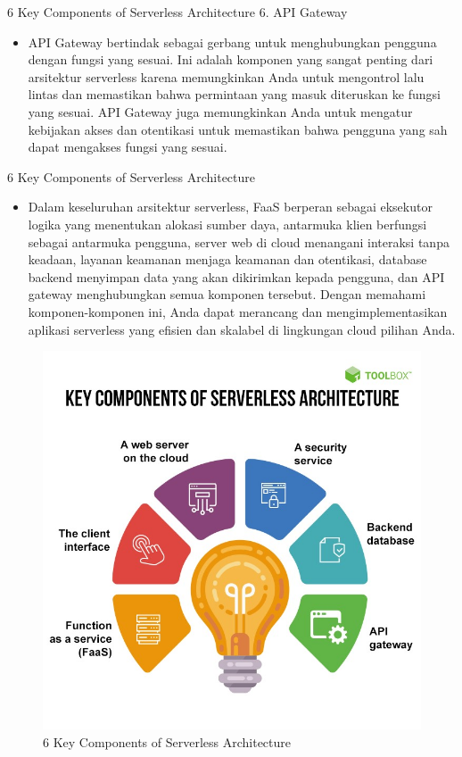 \documentclass{beamer}
\begin{document}
    \begin{frame}{6 Key Components of Serverless Architecture}
    	6. API Gateway
        \begin{itemize}
            \item API Gateway bertindak sebagai gerbang untuk menghubungkan pengguna dengan fungsi yang sesuai. 
            Ini adalah komponen yang sangat penting dari arsitektur serverless karena memungkinkan Anda untuk mengontrol lalu lintas dan memastikan bahwa permintaan yang masuk diteruskan ke fungsi yang sesuai. 
            API Gateway juga memungkinkan Anda untuk mengatur kebijakan akses dan otentikasi untuk memastikan bahwa pengguna yang sah dapat mengakses fungsi yang sesuai.
        \end{itemize}
    \end{frame}

    \begin{frame}{6 Key Components of Serverless Architecture}
        \begin{itemize}
            \item Dalam keseluruhan arsitektur serverless, FaaS berperan sebagai eksekutor logika yang menentukan alokasi sumber daya, antarmuka klien berfungsi sebagai antarmuka pengguna, server web di cloud menangani interaksi tanpa keadaan, layanan keamanan menjaga keamanan dan otentikasi, database backend menyimpan data yang akan dikirimkan kepada pengguna, dan API gateway menghubungkan semua komponen tersebut. 
            Dengan memahami komponen-komponen ini, Anda dapat merancang dan mengimplementasikan aplikasi serverless yang efisien dan skalabel di lingkungan cloud pilihan Anda.
        \end{itemize}
    \end{frame}
    \begin{frame}
    	\begin{figure}
    		\includegraphics[width=0.8\linewidth]{images/komponen.jpg}
    		\centering
    		\caption{6 Key Components of Serverless Architecture}
    	\end{figure}
    \end{frame}
\end{document}
